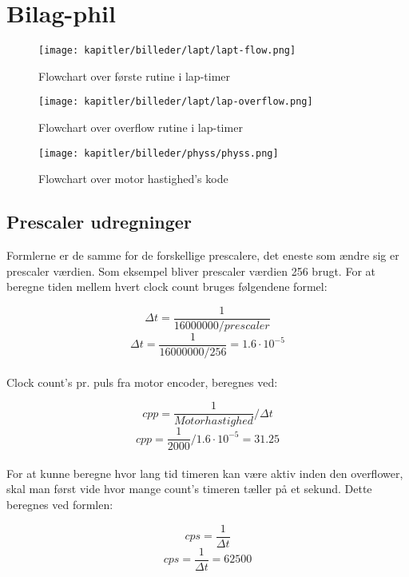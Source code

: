 \newpage

\section{Bilag-phil}

\begin{figure}
\centering
\texttt{[image: kapitler/billeder/lapt/lapt-flow.png]}
\caption{Flowchart over første rutine i lap-timer}
\label{fig:lapt-flow}
\end{figure}

\newpage

\begin{figure}
\centering
\texttt{[image: kapitler/billeder/lapt/lap-overflow.png]}
\caption{Flowchart over overflow rutine i lap-timer}
\label{fig:lap-overflow}
\end{figure}

\newpage

\begin{figure}
\centering
\texttt{[image: kapitler/billeder/physs/physs.png]}
\caption{Flowchart over motor hastighed's kode}
\label{fig:physs}
\end{figure}

\subsection{Prescaler udregninger}
\label{subsec:prescaler_udregninger}
Formlerne er de samme for de forskellige prescalere, det eneste som ændre sig er prescaler værdien. Som eksempel bliver prescaler værdien 256 brugt. For at beregne tiden mellem hvert clock count bruges følgendene formel:

$$\Delta t = \frac{1}{16000000/prescaler}$$
$$\Delta t = \frac{1}{16000000/256} = 1.6 \cdot 10^{-5}$$\\

Clock count's pr. puls fra motor encoder, beregnes ved:

$$cpp = \frac{1}{Motor hastighed} / \Delta t$$
$$cpp = \frac{1}{2000} / 1.6 \cdot 10^{-5} = 31.25$$\\

For at kunne beregne hvor lang tid timeren kan være aktiv inden den overflower, skal man først vide hvor mange count's timeren tæller på et sekund. Dette beregnes ved formlen:

$$cps = \frac{1}{\Delta t}$$
$$cps = \frac{1}{\Delta t} = 62500$$\\

